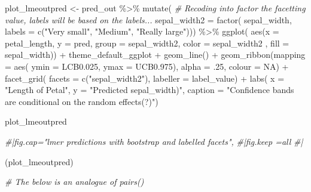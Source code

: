 \documentclass[
]{article}
\newenvironment{Shaded}{\begin{snugshade}}{\end{snugshade}}
\newcommand{\AttributeTok}[1]{\textcolor[rgb]{0.77,0.63,0.00}{#1}}
\newcommand{\CommentTok}[1]{\textcolor[rgb]{0.56,0.35,0.01}{\textit{#1}}}
\newcommand{\ConstantTok}[1]{\textcolor[rgb]{0.00,0.00,0.00}{#1}}
\newcommand{\DecValTok}[1]{\textcolor[rgb]{0.00,0.00,0.81}{#1}}
\newcommand{\FloatTok}[1]{\textcolor[rgb]{0.00,0.00,0.81}{#1}}
\newcommand{\FunctionTok}[1]{\textcolor[rgb]{0.00,0.00,0.00}{#1}}
\newcommand{\NormalTok}[1]{#1}
\newcommand{\OtherTok}[1]{\textcolor[rgb]{0.56,0.35,0.01}{#1}}
\newcommand{\SpecialCharTok}[1]{\textcolor[rgb]{0.00,0.00,0.00}{#1}}
\newcommand{\StringTok}[1]{\textcolor[rgb]{0.31,0.60,0.02}{#1}}
\begin{document}
\begin{Shaded}
\begin{Highlighting}[]
\NormalTok{plot\_lmeoutpred }\OtherTok{\textless{}{-}} 
\NormalTok{  pred\_out }\SpecialCharTok{\%\textgreater{}\%}
    \FunctionTok{mutate}\NormalTok{( }
      \CommentTok{\# Recoding into factor the facetting value, labels will be based on the labels...}
      \AttributeTok{sepal\_width2 =} \FunctionTok{factor}\NormalTok{( sepal\_width, }\AttributeTok{labels =} \FunctionTok{c}\NormalTok{(}\StringTok{"Very small"}\NormalTok{, }
                                                     \StringTok{"Medium"}\NormalTok{, }
                                                     \StringTok{"Really large"}\NormalTok{))) }\SpecialCharTok{\%\textgreater{}\%}
    \FunctionTok{ggplot}\NormalTok{( }\FunctionTok{aes}\NormalTok{(}\AttributeTok{x =}\NormalTok{ petal\_length, }\AttributeTok{y =}\NormalTok{ pred, }
                \AttributeTok{group =}\NormalTok{ sepal\_width2, }\AttributeTok{color =}\NormalTok{ sepal\_width2}
\NormalTok{                , }\AttributeTok{fill =}\NormalTok{ sepal\_width)) }\SpecialCharTok{+}
\NormalTok{    theme\_default\_ggplot }\SpecialCharTok{+}
    \FunctionTok{geom\_line}\NormalTok{() }\SpecialCharTok{+}
    \FunctionTok{geom\_ribbon}\NormalTok{(}\AttributeTok{mapping =} \FunctionTok{aes}\NormalTok{( }\AttributeTok{ymin =}\NormalTok{ LCB0}\FloatTok{.025}\NormalTok{, }
                               \AttributeTok{ymax =}\NormalTok{ UCB0}\FloatTok{.975}\NormalTok{), }
                \AttributeTok{alpha =}\NormalTok{ .}\DecValTok{25}\NormalTok{, }
                \AttributeTok{colour =} \ConstantTok{NA}\NormalTok{) }\SpecialCharTok{+}
    \FunctionTok{facet\_grid}\NormalTok{( }\AttributeTok{facets =} \FunctionTok{c}\NormalTok{(}\StringTok{"sepal\_width2"}\NormalTok{), }\AttributeTok{labeller =}\NormalTok{ label\_value) }\SpecialCharTok{+}
    \FunctionTok{labs}\NormalTok{( }\AttributeTok{x =} \StringTok{"Length of Petal"}\NormalTok{,}
          \AttributeTok{y =} \StringTok{"Predicted sepal\_width)"}\NormalTok{,}
          \AttributeTok{caption =} \StringTok{"Confidence bands are conditional on the random effects(?)"}\NormalTok{)}

\NormalTok{plot\_lmeoutpred}

\CommentTok{\#|fig.cap="lmer predictions with bootstrap and labelled facets", }
\CommentTok{\#|fig.keep =\textquotesingle{}all\textquotesingle{}}
\CommentTok{\#|}

\NormalTok{(plot\_lmeoutpred)}


\CommentTok{\# The below is an analogue of pairs()}


\end{Highlighting}
\end{Shaded}
\end{document}
